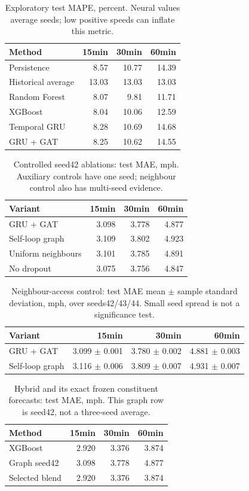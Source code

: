 \begin{table}[t]\centering\small
\caption{Exploratory test MAPE, percent. Neural values average seeds; low positive speeds can inflate this metric.}
\begin{tabular}{lrrr}\toprule
Method & 15min & 30min & 60min\\\midrule
Persistence & 8.57 & 10.77 & 14.39\\
Historical average & 13.03 & 13.03 & 13.03\\
Random Forest & 8.07 & 9.81 & 11.71\\
XGBoost & 8.04 & 10.06 & 12.59\\
Temporal GRU & 8.28 & 10.69 & 14.68\\
GRU + GAT & 8.25 & 10.62 & 14.55\\
\bottomrule\end{tabular}
\end{table}

\begin{table}[t]\centering\small
\caption{Controlled seed42 ablations: test MAE, mph. Auxiliary controls have one seed; neighbour control also has multi-seed evidence.}
\begin{tabular}{lrrr}\toprule
Variant & 15min & 30min & 60min\\\midrule
GRU + GAT & 3.098 & 3.778 & 4.877\\
Self-loop graph & 3.109 & 3.802 & 4.923\\
Uniform neighbours & 3.101 & 3.785 & 4.891\\
No dropout & 3.075 & 3.756 & 4.847\\
\bottomrule\end{tabular}
\end{table}

\begin{table}[t]\centering\small
\caption{Neighbour-access control: test MAE mean $\pm$ sample standard deviation, mph, over seeds42/43/44. Small seed spread is not a significance test.}
\begin{tabular}{lrrr}\toprule
Variant & 15min & 30min & 60min\\\midrule
GRU + GAT & 3.099 $\pm$ 0.001 & 3.780 $\pm$ 0.002 & 4.881 $\pm$ 0.003\\
Self-loop graph & 3.116 $\pm$ 0.006 & 3.809 $\pm$ 0.007 & 4.931 $\pm$ 0.007\\
\bottomrule\end{tabular}
\end{table}

\begin{table}[t]\centering\small
\caption{Hybrid and its exact frozen constituent forecasts: test MAE, mph. This graph row is seed42, not a three-seed average.}
\begin{tabular}{lrrr}\toprule
Method & 15min & 30min & 60min\\\midrule
XGBoost & 2.920 & 3.376 & 3.874\\
Graph seed42 & 3.098 & 3.778 & 4.877\\
Selected blend & 2.920 & 3.376 & 3.874\\
\bottomrule\end{tabular}
\end{table}

